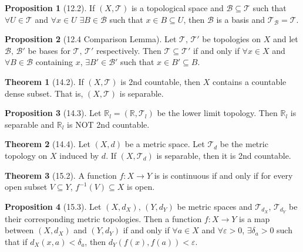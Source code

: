 \documentclass{article}
\newcommand{\R}{\ensuremath{\mathbb{R}}}
\newcommand{\B}{\ensuremath{\mathcal{B}}}
\newcommand{\Iff}{if and only if}
\newcommand{\ts}{topological space}
\newcommand{\func}[3]{\ensuremath{#1: #2 \to #3}}
\newcommand{\tp}{\ensuremath{\mathscr{T}}}
\newcommand{\Ts}[2]{\ensuremath{(#1,#2)}}
\renewcommand{\Subset}{\subseteq}
\theoremstyle{definition}
\newtheorem*{thm}{Theorem}
\newtheorem*{prop}{Proposition}
\theoremstyle{remark}
\begin{document}
{        \begin{prop}[12.2]
            If $\Ts{X}{\tp}$ is a \ts{} and $\B \Subset \tp$ such that $\forall U \in \tp$ and $\forall x \in U$ $\exists B \in \B$ such that $x \in B \Subset U$, then $\B$ is a basis and $\tp_\B = \tp$.
        \end{prop}
        
        \begin{prop}[12.4 Comparison Lemma]
            Let $\tp, \, \tp'$ be topologies on $X$ and let $\B, \, \B'$ be bases for $\tp, \, \tp'$ respectively. Then $\tp \Subset \tp'$ \Iff{} $\forall x \in X$ and $\forall B \in \B$ containing $x$, $\exists B' \in \B'$ such that $x \in B' \Subset B$.
        \end{prop}
        
        \begin{thm}[14.2]
            If $\Ts{X}{\tp}$ is 2nd countable, then $X$ contains a countable dense subset. That is, $\Ts{X}{\tp}$ is separable.
        \end{thm}
        
        \begin{prop}[14.3]
            Let $\R_l=\Ts{\R}{\tp_l}$ be the lower limit topology. Then $\R_l$ is separable and $\R_l$ is NOT 2nd countable.
        \end{prop}
        
        \begin{thm}[14.4]
            Let $\Ts{X}{d}$ be a metric space. Let $\tp_d$ be the metric topology on $X$ induced by $d$. If $\Ts{X}{\tp_d}$ is separable, then it is 2nd countable.
        \end{thm}
        
        \begin{thm}[15.2]
            A function $\func{f}{X}{Y}$ is is continuous \Iff{} for every open subset $V \Subset Y$, $f^{-1}(V) \Subset X$ is open.
        \end{thm}
        
        \begin{prop}[15.3]
            Let $(X,d_X), \, (Y,d_Y)$ be metric spaces and $\tp_{d_X}, \, \tp_{d_Y}$ be their corresponding metric topologies. Then a function $\func{f}{X}{Y}$ is a map between $(X,d_X)$ and $(Y,d_Y)$ \Iff{} $\forall a \in X$ and $\forall \varepsilon > 0$, $\exists \delta_a > 0$ such that if $d_X(x,a) < \delta_a$, then $d_Y(f(x),f(a))<\varepsilon$.
        \end{prop}
        
}
\end{document}
